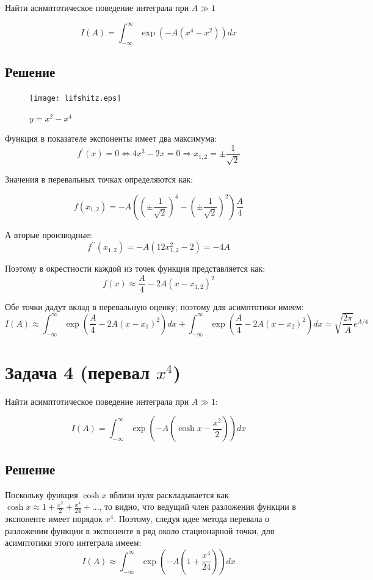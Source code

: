 \documentclass[a4paper,12pt]{article}
\begin{document}
Найти асимптотическое поведение интеграла при $A\gg1$

\[
I(A)=\int_{-\infty}^{\infty}\exp(-A(x^{4}-x^{2}))dx
\]



\subsection*{Решение}

\begin{figure}[h]
	\caption{$y=x^{2}-x^{4}$}
	\centering
	\texttt{[image: lifshitz.eps]}
\end{figure}

\noindent
Функция в показателе экспоненты имеет два максимума: 
\[
f^{\prime}(x)=0\Leftrightarrow4x^{3}-2x=0\Rightarrow x_{1,2}=\pm\frac{1}{\sqrt{2}}
\]

\noindent
Значения в перевальных точках определяются как:

\[
f(x_{1,2})=-A\left(\left(\pm\frac{1}{\sqrt{2}}\right)^{4}-\left(\pm\frac{1}{\sqrt{2}}\right)^{2}\right)\frac{A}{4}
\]

\noindent
А вторые производные:
\[
f^{\prime\prime}(x_{1,2})=-A(12x_{1,2}^{2}-2)=-4A
\]

\noindent
Поэтому в окрестности каждой из точек функция представляется как:
\[
f(x)\approx\frac{A}{4}-2A(x-x_{1,2})^{2}
\]

\noindent
Обе точки дадут вклад в перевальную оценку; поэтому для асимптотики
имеем:
\[
I\left(A\right)\approx\int_{-\infty}^{\infty}\exp\left(\frac{A}{4}-2A(x-x_{1})^{2}\right)dx+\int_{-\infty}^{\infty}\exp\left(\frac{A}{4}-2A(x-x_{2})^{2}\right)dx=\sqrt{\frac{2\pi}{A}}e^{A/4}
\]



\section*{Задача 4 (перевал $x^4$)}

Найти асимптотическое поведение интеграла при $A\gg1$:

\[
I\left(A\right)=\int_{-\infty}^{\infty}\exp\left(-A\left(\cosh x-\frac{x^{2}}{2}\right)\right)dx
\]



\subsection*{Решение}

Поскольку функция $\cosh x$ вблизи нуля раскладывается как $\cosh x\approx1+\frac{x^{2}}{2}+\frac{x^{4}}{24}+\dots$,
то видно, что ведущий член разложения функции в экспоненте имеет порядок
$x^{4}$. Поэтому, следуя идее метода перевала о разложении функции
в экспоненте в ряд около стационарной точки, для асимптотики этого
интеграла имеем:
\[
I(A)\approx\int_{-\infty}^{\infty}\exp\left(-A\left(1+\frac{x^{4}}{24}\right)\right)dx
\]
\end{document}
